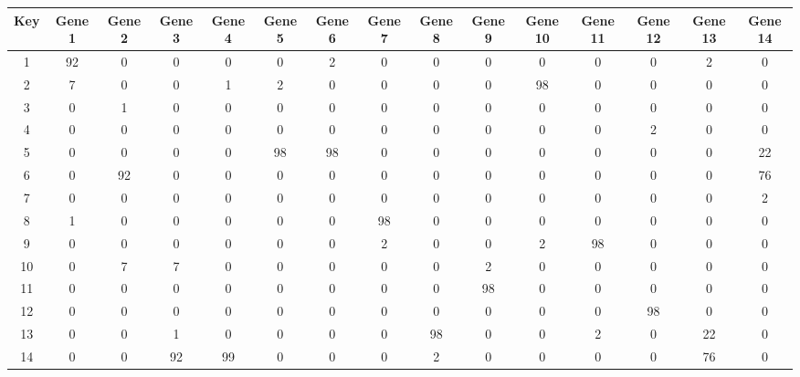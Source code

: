 \begin{tabular}{|c|c|c|c|c|c|c|c|c|c|c|c|c|c|c|}
\hline
Key & Gene 1 & Gene 2 & Gene 3 & Gene 4 & Gene 5 & Gene 6 & Gene 7 & Gene 8 & Gene 9 & Gene 10 & Gene 11 & Gene 12 & Gene 13 & Gene 14 \\
\hline
1 & 92 & 0 & 0 & 0 & 0 & 2 & 0 & 0 & 0 & 0 & 0 & 0 & 2 & 0 \\
2 & 7 & 0 & 0 & 1 & 2 & 0 & 0 & 0 & 0 & 98 & 0 & 0 & 0 & 0 \\
3 & 0 & 1 & 0 & 0 & 0 & 0 & 0 & 0 & 0 & 0 & 0 & 0 & 0 & 0 \\
4 & 0 & 0 & 0 & 0 & 0 & 0 & 0 & 0 & 0 & 0 & 0 & 2 & 0 & 0 \\
5 & 0 & 0 & 0 & 0 & 98 & 98 & 0 & 0 & 0 & 0 & 0 & 0 & 0 & 22 \\
6 & 0 & 92 & 0 & 0 & 0 & 0 & 0 & 0 & 0 & 0 & 0 & 0 & 0 & 76 \\
7 & 0 & 0 & 0 & 0 & 0 & 0 & 0 & 0 & 0 & 0 & 0 & 0 & 0 & 2 \\
8 & 1 & 0 & 0 & 0 & 0 & 0 & 98 & 0 & 0 & 0 & 0 & 0 & 0 & 0 \\
9 & 0 & 0 & 0 & 0 & 0 & 0 & 2 & 0 & 0 & 2 & 98 & 0 & 0 & 0 \\
10 & 0 & 7 & 7 & 0 & 0 & 0 & 0 & 0 & 2 & 0 & 0 & 0 & 0 & 0 \\
11 & 0 & 0 & 0 & 0 & 0 & 0 & 0 & 0 & 98 & 0 & 0 & 0 & 0 & 0 \\
12 & 0 & 0 & 0 & 0 & 0 & 0 & 0 & 0 & 0 & 0 & 0 & 98 & 0 & 0 \\
13 & 0 & 0 & 1 & 0 & 0 & 0 & 0 & 98 & 0 & 0 & 2 & 0 & 22 & 0 \\
14 & 0 & 0 & 92 & 99 & 0 & 0 & 0 & 2 & 0 & 0 & 0 & 0 & 76 & 0 \\
\hline
\end{tabular}